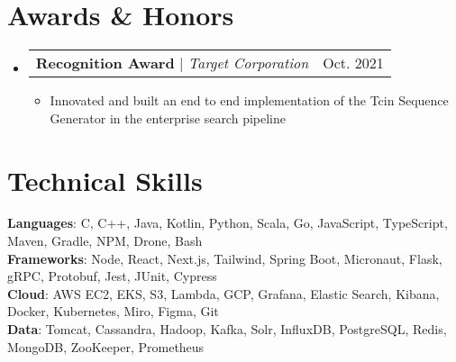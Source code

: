 \documentclass[letterpaper,11pt]{article}
\makeatletter
\newcommand{\resumeItem}[1]{
  \item\small{
    {#1 \vspace{-2pt}}
  }
}
\newcommand{\resumeProjectHeading}[2]{
    \item
    \begin{tabular*}{0.97\textwidth}{l@{\extracolsep{\fill}}r}
      \small#1 & #2 \\
    \end{tabular*}\vspace{-7pt}
}
\newcommand{\resumeSubHeadingListStart}{\begin{itemize}[leftmargin=0.15in, label={}]}
\newcommand{\resumeSubHeadingListEnd}{\end{itemize}}
\newcommand{\resumeItemListStart}{\begin{itemize}}
\newcommand{\resumeItemListEnd}{\end{itemize}\vspace{-5pt}}
\makeatother
\begin{document}
\section{Awards \& Honors}
    \resumeSubHeadingListStart
      \resumeProjectHeading
          {\textbf{Recognition Award} $|$ \emph{Target Corporation}}{Oct. 2021}
          \resumeItemListStart
            \resumeItem{Innovated and built an end to end implementation of the Tcin Sequence Generator in the enterprise search pipeline}
          \resumeItemListEnd
    \resumeSubHeadingListEnd


\section{Technical Skills}
 \begin{itemize}[leftmargin=0.15in, label={}]
    \small{\item{
     \textbf{Languages}{: C, C++, Java, Kotlin, Python, Scala, Go, JavaScript, TypeScript, Maven, Gradle, NPM, Drone, Bash} \\
     \textbf{Frameworks}{: Node, React, Next.js, Tailwind, Spring Boot, Micronaut, Flask, gRPC, Protobuf, Jest, JUnit, Cypress} \\
     \textbf{Cloud}{: AWS EC2, EKS, S3, Lambda, GCP, Grafana, Elastic Search, Kibana, Docker, Kubernetes, Miro, Figma, Git} \\
     \textbf{Data}{: Tomcat, Cassandra, Hadoop, Kafka, Solr, InfluxDB, PostgreSQL, Redis, MongoDB, ZooKeeper, Prometheus}
    }}
 \end{itemize}


\end{document}
